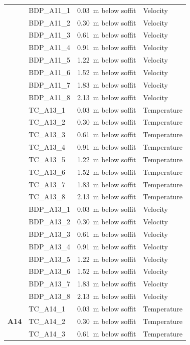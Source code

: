 \documentclass[12pt,oneside]{book}
\begin{document}
\begin{longtable}[c]{c|lll}
\cline{2-4}
 & BDP\_A11\_1 & 0.03~m below soffit  & Velocity \\
 & BDP\_A11\_2 & 0.30~m below soffit  & Velocity \\
 & BDP\_A11\_3 & 0.61~m below soffit  & Velocity \\
 & BDP\_A11\_4 & 0.91~m below soffit  & Velocity \\
 & BDP\_A11\_5 & 1.22~m below soffit  & Velocity \\
 & BDP\_A11\_6 & 1.52~m below soffit  & Velocity \\
 & BDP\_A11\_7 & 1.83~m below soffit  & Velocity \\
 & BDP\_A11\_8 & 2.13~m below soffit  & Velocity \\
\bottomrule
\newpage
\multirow{16}{*}{\large{\textbf{A13}}}
 & TC\_A13\_1  & 0.03~m below soffit  & Temperature \\
 & TC\_A13\_2  & 0.30~m below soffit  & Temperature \\
 & TC\_A13\_3  & 0.61~m below soffit  & Temperature \\
 & TC\_A13\_4  & 0.91~m below soffit  & Temperature \\
 & TC\_A13\_5  & 1.22~m below soffit  & Temperature \\
 & TC\_A13\_6  & 1.52~m below soffit  & Temperature \\
 & TC\_A13\_7  & 1.83~m below soffit  & Temperature \\
 & TC\_A13\_8  & 2.13~m below soffit  & Temperature \\
\cline{2-4}
 & BDP\_A13\_1 & 0.03~m below soffit  & Velocity \\
 & BDP\_A13\_2 & 0.30~m below soffit  & Velocity \\
 & BDP\_A13\_3 & 0.61~m below soffit  & Velocity \\
 & BDP\_A13\_4 & 0.91~m below soffit  & Velocity \\
 & BDP\_A13\_5 & 1.22~m below soffit  & Velocity \\
 & BDP\_A13\_6 & 1.52~m below soffit  & Velocity \\
 & BDP\_A13\_7 & 1.83~m below soffit  & Velocity \\
 & BDP\_A13\_8 & 2.13~m below soffit  & Velocity \\
\midrule
\multirow{16}{*}{\large{\textbf{A14}}}
 & TC\_A14\_1  & 0.03~m below soffit  & Temperature \\
 & TC\_A14\_2  & 0.30~m below soffit  & Temperature \\
 & TC\_A14\_3  & 0.61~m below soffit  & Temperature \\

\end{longtable}
\end{document}
